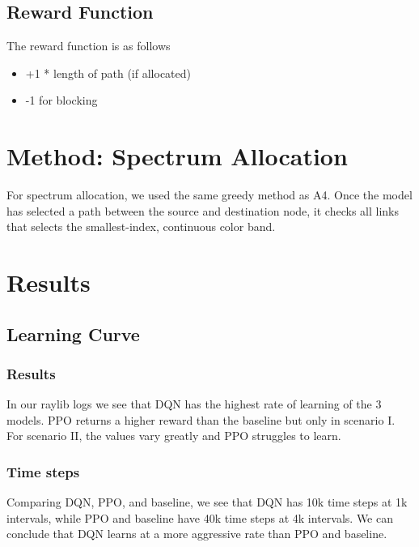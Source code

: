 \documentclass[conference]{IEEEtran}
\begin{document}
\subsection{Reward Function}
The reward function is as follows
\begin{itemize}
    \item +1 * length of path (if allocated)
    \item -1 for blocking
\end{itemize}

\section{Method: Spectrum Allocation}


For spectrum allocation, we used the same greedy method as A4. Once the model has selected a path between the source and destination node, it checks all links that selects the smallest-index, continuous color band.

\section{Results}
\subsection{Learning Curve}
\subsubsection{Results}
In our raylib logs we see that DQN has the highest rate of learning of the 3 models. PPO returns a higher reward than the baseline but only in scenario I. For scenario II, the values vary greatly and PPO struggles to learn.

\subsubsection{Time steps}

Comparing DQN, PPO, and baseline, we see that DQN has 10k time steps at 1k intervals, while PPO and baseline have 40k time steps at 4k intervals. We can conclude that DQN learns at a more aggressive rate than PPO and baseline.
\end{document}
